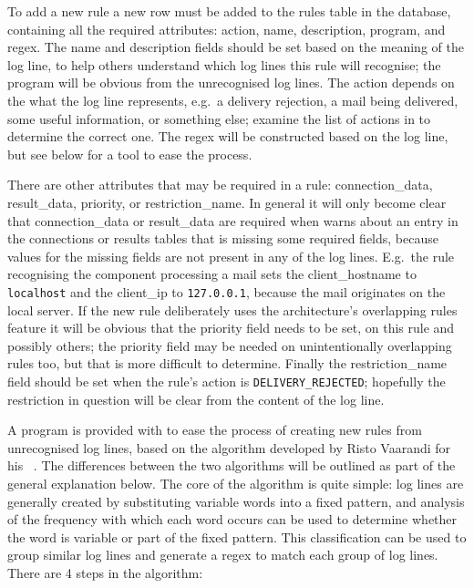 To add a new rule a new row must be added to the rules table in the
database, containing all the required attributes: action, name,
description, program, and regex.  The name and description fields should be
set based on the meaning of the log line, to help others understand which
log lines this rule will recognise; the program will be obvious from the
unrecognised log lines.  The action depends on the what the log line
represents, e.g.\ a delivery rejection, a mail being delivered, some useful
information, or something else; examine the list of actions in
 to determine the correct
one.  The regex will be constructed based on the log line, but see below
for a tool to ease the process.

There are other attributes that may be required in a rule:
connection\_data, result\_data, priority, or restriction\_name.  In general
it will only become clear that connection\_data or result\_data are
required when \parsername{} warns about an entry in the connections or
results tables that is missing some required fields, because values for the
missing fields are not present in any of the log lines.  E.g.\ the rule
recognising the  component processing a mail sets the
client\_hostname to \texttt{localhost} and the client\_ip to
\texttt{127.0.0.1}, because the mail originates on the local server.  If
the new rule deliberately uses the architecture's overlapping rules feature
it will be obvious that the priority field needs to be set, on this rule and
possibly others; the priority field may be needed on unintentionally
overlapping rules too, but that is more difficult to determine.  Finally
the restriction\_name field should be set when the rule's action is
\texttt{DELIVERY\_REJECTED}; hopefully the restriction in question will be
clear from the content of the log line.

A program is provided with \parsername{} to ease the process of creating
new rules from unrecognised log lines, based on the algorithm developed by
Risto Vaarandi for his ~\cite{slct-paper}.  The differences
between the two algorithms will be outlined as part of the general
explanation below.  The core of the  algorithm is quite
simple: log lines are generally created by substituting variable words into
a fixed pattern, and analysis of the frequency with which each word occurs
can be used to determine whether the word is variable or part of the fixed
pattern.  This classification can be used to group similar log lines and
generate a regex to match each group of log lines.  There are 4 steps in
the algorithm:

